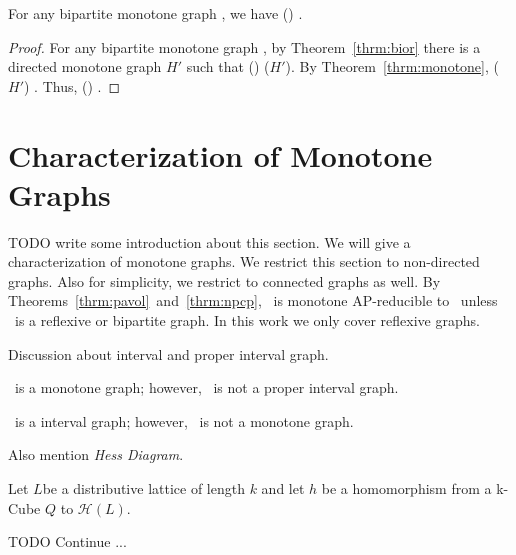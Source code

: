 \begin{theorem} 
For any bipartite monotone graph \mH, we have \chom(\mH) \maple \cbis\@.
\end{theorem}

\begin{proof}
For any bipartite monotone graph \mH, by Theorem~\ref{thrm:bior} there is a directed monotone 
graph \(H'\) such that \chom(\mH) \maple \chom(\(H'\))\@. By Theorem~\ref{thrm:monotone},
\chom(\(H'\)) \maple \cbis\@. Thus, \chom(\mH) \maple \cbis\@.
\end{proof}

\section{Characterization of Monotone Graphs}
TODO write some introduction about this section. We will give a characterization of
monotone graphs. We restrict this section to non-directed graphs. Also for simplicity,
we restrict to connected graphs as well. By Theorems~\ref{thrm:pavol}~and~\ref{thrm:npcp},
\mH\ is monotone AP-reducible to \csat\ unless \mH\ is a reflexive or bipartite graph.	
In this work we only cover reflexive graphs.

Discussion about interval and proper interval graph.

\begin{example}
\mH\ is a monotone graph; however, \mH\ is not a proper interval graph.
\end{example}

\begin{example}
\mH\ is a interval graph; however, \mH\ is not a monotone graph.
\end{example}

\begin{defi} 
Also mention \emph{Hess Diagram}.
\end{defi}

\begin{defi} 
\end{defi}


Let \(L\)be a distributive lattice of length \(k\) and let \(h\) be  a homomorphism from a 
k-Cube \(Q\) to \(\mathcal{H}(L)\)\@.

TODO Continue ...

